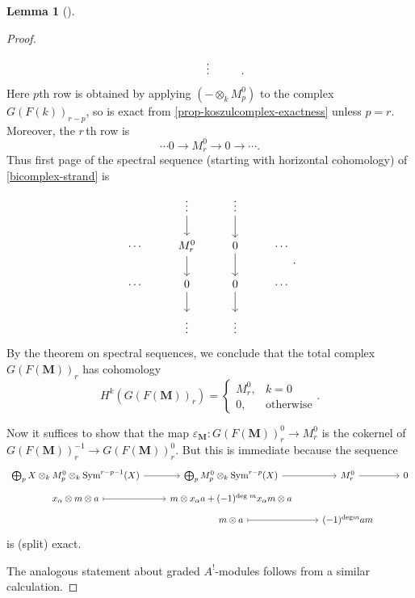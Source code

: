 \documentclass[a4paper]{article}
\theoremstyle{definition}
\newtheorem{lemma}[defn]{Lemma}
\theoremstyle{remark}
\DeclareMathOperator{\Sym}{\text{Sym}}
\begin{document}
\begin{lemma}[]
\begin{proof}
\begin{equation}
\begin{tikzcd}
                   & \vdots 
                   & 
            \end{tikzcd}.\end{equation}
        Here \(p\)th row is obtained by applying \((-\otimes_k M^0_p)\) to the
        complex \(G(F(k))_{r-p}\), so is exact from
        \cref{prop-koszulcomplex-exactness} unless \(p=r\). Moreover, the
        \(r\,\)th row is 
        \[ \cdots 0 \rightarrow M^0_r \rightarrow 0 \rightarrow \cdots. \]  
        Thus first page of the spectral sequence (starting with horizontal
        cohomology) of \eqref{bicomplex-strand} is 
        \[\begin{tikzcd} 
                   & \vdots \arrow[d]
                   & \vdots \arrow[d]
                   & \\
            \cdots 
                   & M^0_r \arrow[d]
                   & 0 \arrow[d]
                   & \cdots \\
            \cdots  
                   & 0 \arrow[d]
                   & 0 \arrow[d]
                   & \cdots \\
                   & \vdots
                   & \vdots 
                   & 
        \end{tikzcd}.\]
        By the theorem on spectral sequences, we
        conclude that the total complex \(G(F(\mathbf{M}))_r\) has cohomology 
        \[H^k(G(F(\mathbf{M}))_r)=\begin{cases} M^0_r, &k=0 \\ 
        0, &\text{otherwise}\end{cases}.\]

        Now it suffices to show that the map
        \(\varepsilon_{\mathbf{M}}:G(F(\mathbf{M}))^0_r \rightarrow M^0_r\) is
        the cokernel of \({G(F(\mathbf{M}))^{-1}_r \rightarrow
        G(F(\mathbf{M}))^0_r}\). But this is immediate because the
        sequence 
        \[\begin{tikzcd}[row sep=tiny] 
            \bigoplus_p X\otimes_k M^0_p \otimes_k \Sym^{r-p-1}(X) 
            \arrow[r]
            & \bigoplus_p  M^0_p \otimes_k \Sym^{r-p}(X) 
            \arrow[r]
            & M^0_r 
            \arrow[r]
            & 0 \\
            x_\alpha \otimes m \otimes a
            \arrow[r, mapsto]
            & m \otimes x_\alpha a + (-1)^{\text{deg }m} x_\alpha m \otimes a
            & \\ 
            & m \otimes a  
            \arrow[r, mapsto]
            & (-1)^{\text{deg} m}am
        \end{tikzcd}\]
        is (split) exact.

        The analogous statement about graded \(A^!\)-modules follows from a
        similar calculation.
        \end{proof}
\end{lemma}
\end{document}
